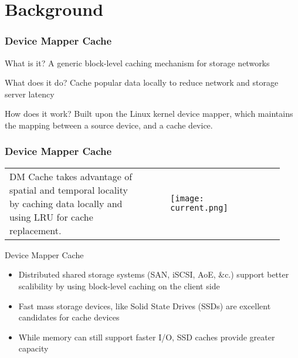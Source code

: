 \section{Background}
%
\begin{frame}
    \frametitle{Device Mapper Cache}
    \begin{block}{What is it?}
	A generic block-level caching mechanism
	for storage networks
    \end{block}
    \vspace{2ex}
    \begin{block}{What does it do?}
	Cache popular data locally to reduce
	network and storage server latency
    \end{block}
    \vspace{2ex}
    \begin{block}{How does it work?}
	Built upon the Linux kernel device mapper, which
	maintains the mapping between a source device, and
	a cache device.
    \end{block}
\end{frame}
\begin{frame}
    \frametitle{Device Mapper Cache}
    \begin{tabular}{m{0.465\linewidth}m{0.465\linewidth}}
	DM Cache takes advantage of spatial and temporal
	locality by caching data locally and using LRU for
	cache replacement. &
	\begin{figure}
	    \centering \texttt{[image: current.png]}
	    \label{fig:dm}
	\end{figure} \\
    \end{tabular}
    \begin{block}{Device Mapper Cache}
	\begin{itemize}
	    \item Distributed shared storage systems (SAN, iSCSI, AoE, \&c.)
		support better scalibility by using block-level caching
		on the client side
	    \item Fast mass storage devices, like Solid State Drives (SSDs) 
		are excellent candidates for cache devices
	    \item While memory can
		still support faster I/O, SSD caches provide greater capacity
	\end{itemize}
    \end{block}
\end{frame}
